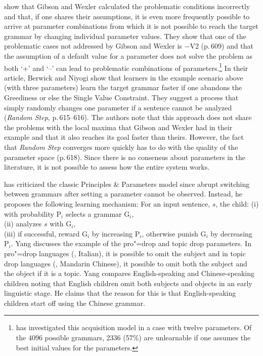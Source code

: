 \citet{BN96a} show that Gibson and Wexler calculated the problematic conditions incorrectly and
that, if one shares their assumptions, it is even more frequently possible
to arrive at parameter combinations from which it is not possible to reach the target grammar by changing individual parameter values.
They show that one of the problematic cases not addressed by Gibson and Wexler is $-$V2 (p.\,609) and that the assumption of a default value
for a parameter does not solve the problem as both `+' and `--' can lead to problematic combinations of parameters.\footnote{
  \citet{Kohl99a,Kohl2000a} has investigated this acquisition model in a case with twelve parameters. Of the 4096 possible grammars,
  2336 (57\%) are unlearnable if one assumes the best initial values for the parameters.
}
In their article, Berwick and Niyogi show that learners in the example scenario above (with three
parameters) learn the target grammar faster if one abandons the Greediness 
or else the Single Value Constraint.
They suggest a process that simply randomly changes one parameter if a sentence cannot be analyzed (\emph{Random Step}, p.\,615--616).
The authors note that this approach does not share the problems with the local maxima  that Gibson and Wexler had in their example and that it also reaches its goal faster
than theirs. However, the fact that \emph{Random Step} converges more quickly has to do with the quality of the parameter space (p.\,618).
Since there is no consensus about parameters in the literature, it is not possible to assess how the entire system works.

\citet[]{Yang2004a} has criticized the classic Principles \& Parameters model since abrupt switching between grammars after setting
a parameter cannot be observed. Instead, he proposes the following learning mechanism:
\ea
For an input sentence, $s$, the child:
(i) with probability P$_i$ selects a grammar G$_i$,\\
(ii) analyzes $s$ with G$_i$,\\
(iii) if successful, reward G$_i$ by increasing P$_i$,
otherwise punish G$_i$ by decreasing P$_i$.
\z
Yang discusses the example of the pro"=drop and topic drop parameters. In pro"=drop languages (\eg, Italian),
it is possible to omit the subject and in topic drop languages (\eg, Mandarin Chinese), it possible to omit both the subject and the object if it is
a topic. Yang compares English-speaking and Chinese-speaking children noting that English children omit both subjects and objects
in an early linguistic stage. He claims that the reason for this is that English-speaking children start off using the Chinese grammar.

